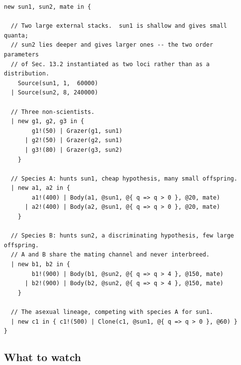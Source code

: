 \documentclass[11pt]{article}
\theoremstyle{plain}
\theoremstyle{definition}
\begin{document}
\begin{lstlisting}
new sun1, sun2, mate in {

  // Two large external stacks.  sun1 is shallow and gives small quanta;
  // sun2 lies deeper and gives larger ones -- the two order parameters
  // of Sec. 13.2 instantiated as two loci rather than as a distribution.
    Source(sun1, 1,  60000)
  | Source(sun2, 8, 240000)

  // Three non-scientists.
  | new g1, g2, g3 in {
        g1!(50) | Grazer(g1, sun1)
      | g2!(50) | Grazer(g2, sun1)
      | g3!(80) | Grazer(g3, sun2)
    }

  // Species A: hunts sun1, cheap hypothesis, many small offspring.
  | new a1, a2 in {
        a1!(400) | Body(a1, @sun1, @{ q => q > 0 }, @20, mate)
      | a2!(400) | Body(a2, @sun1, @{ q => q > 0 }, @20, mate)
    }

  // Species B: hunts sun2, a discriminating hypothesis, few large offspring.
  // A and B share the mating channel and never interbreed.
  | new b1, b2 in {
        b1!(900) | Body(b1, @sun2, @{ q => q > 4 }, @150, mate)
      | b2!(900) | Body(b2, @sun2, @{ q => q > 4 }, @150, mate)
    }

  // The asexual lineage, competing with species A for sun1.
  | new c1 in { c1!(500) | Clone(c1, @sun1, @{ q => q > 0 }, @60) }
}
\end{lstlisting}

\subsection{What to watch}
\end{document}
